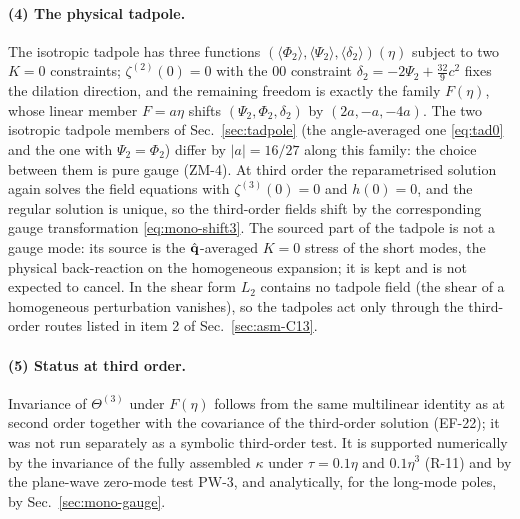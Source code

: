 \paragraph{(4) The physical tadpole.}  The isotropic tadpole has three functions $(\langle\Phi_2\rangle,\langle\Psi_2\rangle,\langle\delta_2\rangle)(\eta)$
subject to two $K=0$ constraints; $\zeta^{(2)}(0)=0$ with the $00$ constraint $\delta_2=-2\Psi_2+\tfrac{32}9c^2$ fixes the dilation direction, and the
remaining freedom is exactly the family $F(\eta)$, whose linear member $F=a\eta$ shifts $(\Psi_2,\Phi_2,\delta_2)$ by $(2a,-a,-4a)$.  The two isotropic
tadpole members of Sec.~\ref{sec:tadpole} (the angle-averaged one \eqref{eq:tad0} and the one with $\Psi_2=\Phi_2$) differ by $|a|=16/27$ along this family:
the choice between them is pure gauge (ZM-4).  At third order the reparametrised solution again solves the field equations with $\zeta^{(3)}(0)=0$ and
$h(0)=0$, and the regular solution is unique, so the third-order fields shift by the corresponding gauge transformation \eqref{eq:mono-shift3}.  The
sourced part of the tadpole is not a gauge mode: its source is the $\hat{\mathbf q}$-averaged $K=0$ stress of the short modes, the physical back-reaction on the
homogeneous expansion; it is kept and is not expected to cancel.  In the shear form $L_2$ contains no tadpole field (the shear of a homogeneous
perturbation vanishes), so the tadpoles act only through the third-order routes listed in item 2 of Sec.~\ref{sec:asm-C13}.

\paragraph{(5) Status at third order.}  Invariance of $\Theta^{(3)}$ under $F(\eta)$ follows from the same multilinear identity as at second order
together with the covariance of the third-order solution (EF-22); it was not run separately as a symbolic third-order test.  It is supported
numerically by the invariance of the fully assembled $\kappa$ under $\tau=0.1\eta$ and $0.1\eta^3$ (R-11) and by the plane-wave zero-mode test PW-3, and
analytically, for the long-mode poles, by Sec.~\ref{sec:mono-gauge}.

